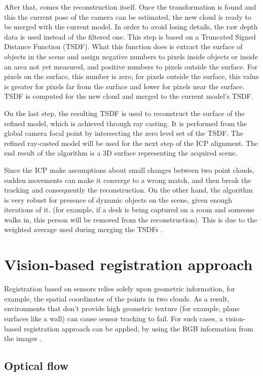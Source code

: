 \documentclass[msc, a4paper, classic, en]{ufbathesis}
\begin{document}
After that, comes the reconstruction itself. Once the transformation is found and this the current pose of the camera can be estimated, the new cloud is ready to be merged with the current model. In order to avoid losing details, the raw depth data is used instead of the filtered one. This step is based on a Truncated Signed Distance Function (TSDF). What this function does is extract the surface of objects in the scene and assign negative numbers to pixels inside objects or inside an area not yet measured, and positive numbers to pixels outside the surface. For pixels on the surface, this number is zero, for pixels outside the surface, this value is greater for pixels far from the surface and lower for pixels near the surface. TSDF is computed for the new cloud and merged to the current model's TSDF.

On the last step, the resulting TSDF is used to reconstruct the surface of the refined model, which is achieved through ray casting. It is performed from the global camera focal point by intersecting the zero level set of the TSDF. The refined ray-casted model will be used for the next step of the ICP alignment. The end result of the algorithm is a 3D surface representing the acquired scene.

Since the ICP make assumptions about small changes between two point clouds, sudden movements can make it converge to a wrong match, and then break the tracking and consequently the reconstruction. On the other hand, the algorithm is very robust for presence of dynamic objects on the scene, given enough iterations of it. (for example, if a desk is being captured on a room and someone walks in, this person will be removed from the reconstruction). This is due to the weighted average used during merging the TSDFs \cite{michele}.

\section{Vision-based registration approach}

Registration based on sensors relies solely upon geometric information, for example, the spatial coordinates of the points in two clouds. As a result, environments that don't provide high geometric texture (for example, plane surfaces like a wall) can cause sensor tracking to fail. For such cases, a vision-based registration approach can be applied, by using the RGB information from the images \cite{kinectkanade}. 
\subsection{Optical flow}
\end{document}

